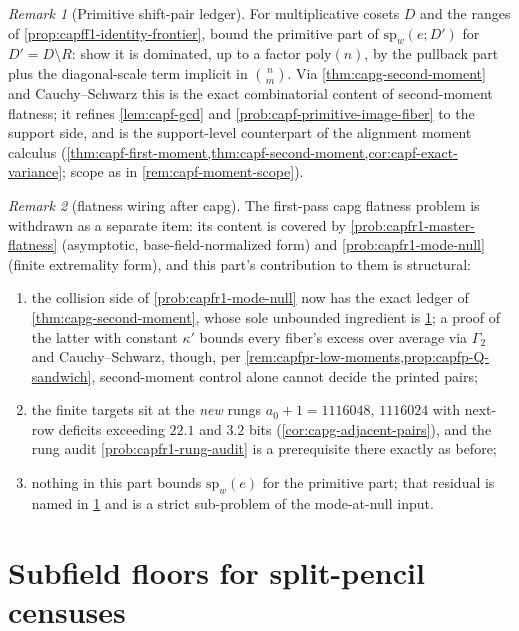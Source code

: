 \documentclass[11pt]{article}
\theoremstyle{definition}
\theoremstyle{remark}
\newtheorem{remark}[remark]{Remark}
\begin{document}
\begin{remark}[Primitive shift-pair ledger]\label{prob:capg-shiftpairs}
For multiplicative cosets $D$ and the ranges of
\cref{prop:capff1-identity-frontier}, bound the primitive part of
$\mathrm{sp}_w(e;D')$ for $D'=D\setminus R$: show it is dominated, up to a
factor $\mathrm{poly}(n)$, by the pullback part plus the diagonal-scale term
implicit in $\binom{n}{m}$.  Via \cref{thm:capg-second-moment} and
Cauchy--Schwarz this is the exact combinatorial content of second-moment
flatness; it refines \cref{lem:capf-gcd} and
\cref{prob:capf-primitive-image-fiber} to the support side, and is the
support-level counterpart of the alignment moment calculus
(\cref{thm:capf-first-moment,thm:capf-second-moment,cor:capf-exact-variance};
scope as in \cref{rem:capf-moment-scope}).
\end{remark}

\begin{remark}[flatness wiring after capg]\label{rem:capg-flatness-wiring}
The first-pass capg flatness problem is withdrawn as a separate item: its
content is covered by \cref{prob:capfr1-master-flatness} (asymptotic,
base-field-normalized form) and \cref{prob:capfr1-mode-null} (finite
extremality form), and this part's contribution to them is structural:
\begin{enumerate}[label=\textup{(\roman*)}]
\item the collision side of \cref{prob:capfr1-mode-null} now has the
exact ledger of \cref{thm:capg-second-moment}, whose sole unbounded
ingredient is \cref{prob:capg-shiftpairs}; a proof of the latter with
constant $\kappa'$ bounds every fiber's excess over average via
$\Gamma_2$ and Cauchy--Schwarz, though, per
\cref{rem:capfpr-low-moments,prop:capfp-Q-sandwich}, second-moment control
alone cannot decide the printed pairs;
\item the finite targets sit at the \emph{new} rungs
$a_0+1=1116048,\,1116024$ with next-row deficits exceeding $22.1$ and $3.2$ bits
(\cref{cor:capg-adjacent-pairs}), and the rung audit
\cref{prob:capfr1-rung-audit} is a prerequisite there exactly as before;
\item nothing in this part bounds $\mathrm{sp}_w(e)$ for the primitive
part; that residual is named in \cref{prob:capg-shiftpairs} and is a
strict sub-problem of the mode-at-null input.
\end{enumerate}
\end{remark}

\section{Subfield floors for split-pencil censuses}\label{sec:capg-subfield}
\end{document}
